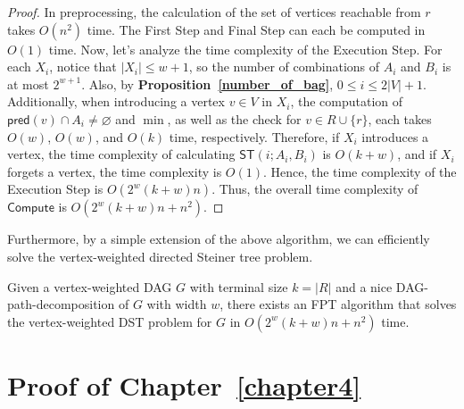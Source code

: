 \documentclass[runningheads]{llncs}
\theoremstyle{plain}
\theoremstyle{definition}
\begin{document}
\begin{proof}
    In preprocessing, the calculation of the set of vertices reachable from $r$ takes $O(n^2)$ time. The First Step and Final Step can each be computed in $O(1)$ time. Now, let’s analyze the time complexity of the Execution Step. For each $X_i$, notice that $|X_i| \leq w + 1$, so the number of combinations of $A_i$ and $B_i$ is at most $2^{w+1}$. Also, by \textbf{Proposition~\ref{number_of_bag}}, $0 \leq i \leq 2|V|+1$. Additionally, when introducing a vertex $v \in V$ in $X_i$, the computation of $\mathsf{pred}(v) \cap A_i \neq \varnothing$ and $\min$, as well as the check for $v \in R \cup \{r\}$, each takes $O(w)$, $O(w)$, and $O(k)$ time, respectively. Therefore, if $X_i$ introduces a vertex, the time complexity of calculating $\mathsf{ST}(i; A_i, B_i)$ is $O(k+w)$, and if $X_i$ forgets a vertex, the time complexity is $O(1)$. Hence, the time complexity of the Execution Step is $O(2^w(k+w)n)$. Thus, the overall time complexity of $\mathsf{Compute}$ is $O(2^w(k+w)n + n^2)$.
\end{proof}

Furthermore, by a simple extension of the above algorithm, we can efficiently solve the vertex-weighted directed Steiner tree problem.

\begin{theorem}
    Given a vertex-weighted DAG $G$ with terminal size $k = |R|$ and a nice DAG-path-decomposition of $G$ with width $w$, there exists an FPT algorithm that solves the vertex-weighted DST problem for $G$ in $O(2^w(k+w)n + n^2)$ time.
\end{theorem}





























\section{Proof of Chapter~\ref{chapter4}}
\end{document}
